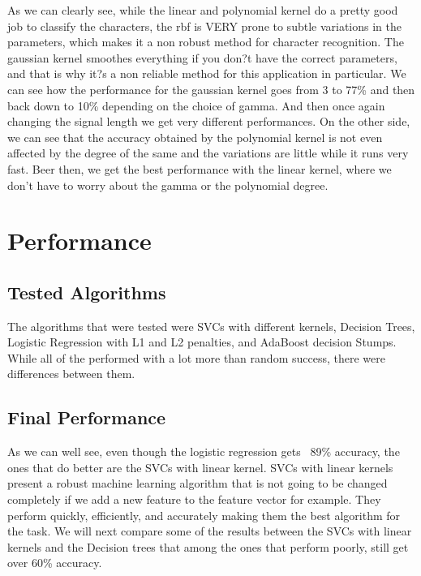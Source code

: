 \documentclass{article}
\begin{document}
As we can clearly see, while the linear and polynomial kernel do a pretty good job to classify the characters, the rbf is VERY prone to subtle variations in the parameters, which makes it a non robust method for character recognition. The gaussian kernel smoothes everything if you don?t have the correct parameters, and that is why it?s a non reliable method for this application in particular. We can see how the performance for the gaussian kernel goes from 3 to 77\% and then back down to 10\% depending on the choice of gamma. And then once again changing the signal length we get very different performances.
On the other side, we can see that the accuracy obtained by the polynomial kernel is not even affected by the degree of the same and the variations are little while it runs very fast. Beer then, we get the best performance with the linear kernel, where we don't have to worry about the gamma or the polynomial degree.


\section{Performance}
\subsection{Tested Algorithms}
The algorithms that were tested were SVCs with different kernels, Decision Trees, Logistic Regression with L1 and L2 penalties, and AdaBoost decision Stumps. While all of the performed with a lot more than random success, there were differences between them.

\subsection{Final Performance}

 As we can well see, even though the logistic regression gets ~89\% accuracy, the ones that do better are the SVCs with linear kernel. SVCs with linear kernels present a robust machine learning algorithm that is not going to be changed completely if we add a new feature to the feature vector for example. They perform quickly, efficiently, and accurately making them the best algorithm for the task. We will next compare some of the results between the SVCs with linear kernels and the Decision trees that among the ones that perform poorly, still get over 60\% accuracy.
\end{document}
